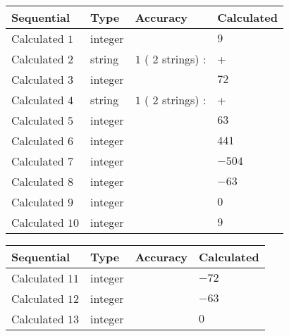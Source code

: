 \documentclass[12pt]{article}
\begin{document}
  
\noindent\begin{tabular}{|l|l|l|l|}
\hline
 Sequential & Type & Accuracy & Calculated \\ 
\hline
 
 
  Calculated $           1$ & integer &  & 
  $ 9 $ 
 \\  \hline  
 
 
  Calculated $           2$ & string & $           1 $ ( $          2 $ strings)
 : 
 & +
 \\  \hline  
 
 
  Calculated $           3$ & integer &  & 
  $ 72 $ 
 \\  \hline  
 
 
  Calculated $           4$ & string & $           1 $ ( $          2 $ strings)
 : 
 & +
 \\  \hline  
 
 
  Calculated $           5$ & integer &  & 
  $ 63 $ 
 \\  \hline  
 
 
  Calculated $           6$ & integer &  & 
  $ 441 $ 
 \\  \hline  
 
 
  Calculated $           7$ & integer &  & 
  $ -504 $ 
 \\  \hline  
 
 
  Calculated $           8$ & integer &  & 
  $ -63 $ 
 \\  \hline  
 
 
  Calculated $           9$ & integer &  & 
  $ 0 $ 
 \\  \hline  
 
 
  Calculated $          10$ & integer &  & 
  $ 9 $ 
 \\  \hline  
 \end{tabular}
   
   
  
  
\noindent\begin{tabular}{|l|l|l|l|}
\hline
 Sequential & Type & Accuracy & Calculated \\ 
\hline
 
 
  Calculated $          11$ & integer &  & 
  $ -72 $ 
 \\  \hline  
 
 
  Calculated $          12$ & integer &  & 
  $ -63 $ 
 \\  \hline  
 
 
  Calculated $          13$ & integer &  & 
  $ 0 $ 
 \\  \hline  
 \end{tabular}
   
\end{document}
